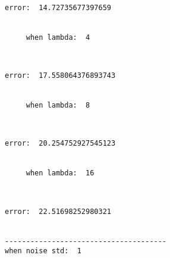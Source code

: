 \documentclass[11pt]{article}
\begin{document}
    \begin{Verbatim}[commandchars=\\\{\}]
     error:  14.72735677397659


     when lambda:  4

    \end{Verbatim}

    \begin{center}
    \end{center}
    { \hspace*{\fill} \\}
    
    \begin{Verbatim}[commandchars=\\\{\}]
     error:  17.558064376893743


     when lambda:  8

    \end{Verbatim}

    \begin{center}
    \end{center}
    { \hspace*{\fill} \\}
    
    \begin{Verbatim}[commandchars=\\\{\}]
     error:  20.254752927545123


     when lambda:  16

    \end{Verbatim}

    \begin{center}
    \end{center}
    { \hspace*{\fill} \\}
    
    \begin{Verbatim}[commandchars=\\\{\}]
     error:  22.51698252980321


--------------------------------------
when noise std:  1

    \end{Verbatim}

    \begin{center}
    \end{center}
    { \hspace*{\fill} \\}
    
\end{document}
